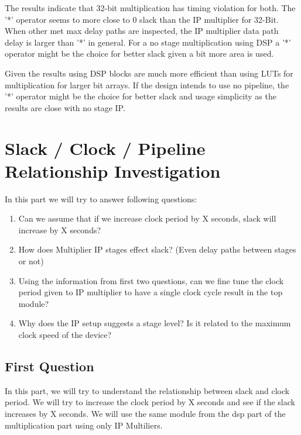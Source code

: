 \documentclass{report}
\begin{document}
The results indicate that 32-bit multiplication has timing violation for both. The '*' operator seems to more close to 0 slack than the IP multiplier for 32-Bit.
When other met max delay paths are inspected, the IP multiplier data path delay is larger than '*' in general.
For a no stage multiplication using DSP a '*' operator might be the choice for better slack given a bit more area is used.

Given the results using DSP blocks are much more efficient than using LUTs for multiplication for larger bit arrays.
If the design intends to use no pipeline, the '*' operator might be the choice for better slack and usage simplicity as the results are close with no stage IP. 

\section{Slack / Clock / Pipeline Relationship Investigation}
In this part we will try to answer following questions: 
\begin{enumerate}
    \item Can we assume that if we increase clock period by X seconds, slack will increase by X seconds?
    \item How does Multiplier IP stages effect slack? (Even delay paths between stages or not)
    \item Using the information from first two questions, can we fine tune the clock period given to IP multiplier to have a single clock cycle result in the top module?
    \item Why does the IP setup suggests a stage level? Is it related to the maximum clock speed of the device?
\end{enumerate}

\subsection{First Question}
In this part, we will try to understand the relationship between slack and clock period. We will try to increase the clock period by X seconds and see if the slack increases by X seconds.
We will use the same module from the dsp part of the multiplication part using only IP Multiliers.
\end{document}
